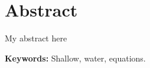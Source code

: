 \chapter*{Abstract}

  My abstract here

\vspace{0.5 cm}
\begin{flushleft}
{\textbf{Keywords:} Shallow, water, equations.}
\end{flushleft}